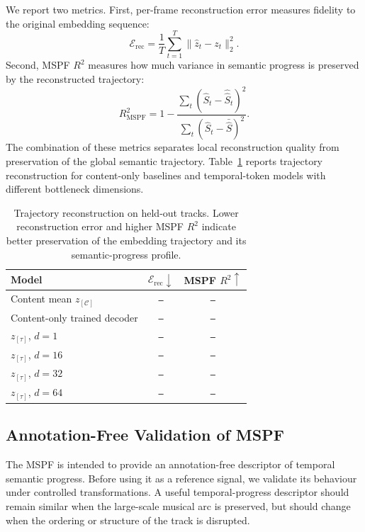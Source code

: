 \documentclass{article}
\newcommand{\zC}{z_{[\mathcal{C}]}}    %
\newcommand{\ztau}{z_{[\tau]}}          %
\newcommand{\muspf}{\hat{S}}            %
\newcommand{\res}{\texttt{--}}
\begin{document}
We report two metrics.  First, per-frame reconstruction error
measures fidelity to the original embedding sequence:
%
\begin{equation}
  \mathcal{E}_{\mathrm{rec}}
  =
  \frac{1}{T}
  \sum_{t=1}^{T}
  \|\hat{z}_t-z_t\|_2^2.
  \label{eq:exp_recon_mse}
\end{equation}
%
Second, MSPF $R^2$ measures how much variance in semantic progress
is preserved by the reconstructed trajectory:
%
\begin{equation}
  R^2_{\mathrm{MSPF}}
  =
  1 -
  \frac{
    \sum_t (\muspf_t-\hat{\muspf}_t)^2
  }{
    \sum_t (\muspf_t-\bar{\muspf})^2
  }.
  \label{eq:exp_mspf_r2}
\end{equation}
%
The combination of these metrics separates local reconstruction
quality from preservation of the global semantic trajectory.
Table~\ref{tab:reconstruction} reports trajectory reconstruction
for content-only baselines and temporal-token models with different
bottleneck dimensions.

\begin{table}[t]
  \centering
  \setlength{\tabcolsep}{5.0pt}
  \caption{Trajectory reconstruction on held-out tracks.  Lower
    reconstruction error and higher MSPF $R^2$ indicate better
    preservation of the embedding trajectory and its semantic-progress
  profile.}
  \label{tab:reconstruction}
  \begin{tabular}{lcc}
    \toprule
    \textbf{Model}
    & $\mathcal{E}_{\mathrm{rec}}\downarrow$
    & MSPF $R^2\uparrow$ \\
    \midrule
    Content mean $\zC$ & \res & \res \\
    Content-only trained decoder & \res & \res \\
    \midrule
    $\ztau$, $d=1$ & \res & \res \\
    $\ztau$, $d=16$ & \res & \res \\
    $\ztau$, $d=32$ & \res & \res \\
    $\ztau$, $d=64$ & \res & \res \\
    \bottomrule
  \end{tabular}
\end{table}

\subsection{Annotation-Free Validation of MSPF}
\label{ssec:exp_mspf}

The MSPF is intended to provide an annotation-free descriptor of
temporal semantic progress.  Before using it as a reference signal,
we validate its behaviour under controlled transformations.  A
useful temporal-progress descriptor should remain similar when the
large-scale musical arc is preserved, but should change when the
ordering or structure of the track is disrupted.
\end{document}
